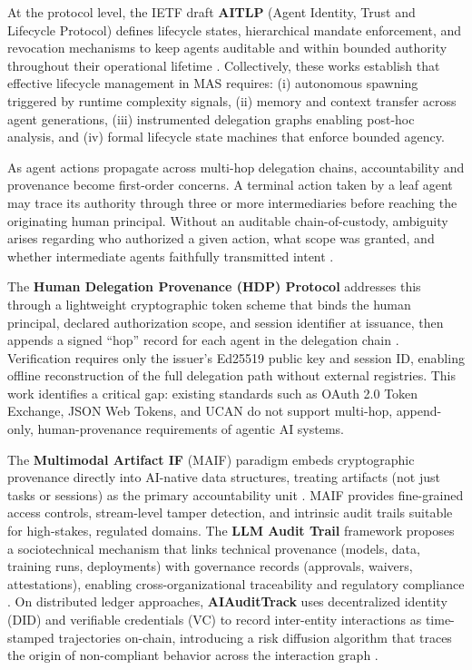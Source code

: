 At the protocol level, the IETF draft \textbf{AITLP} (Agent Identity, Trust and Lifecycle Protocol) defines lifecycle states, hierarchical mandate enforcement, and revocation mechanisms to keep agents auditable and within bounded authority throughout their operational lifetime \cite{aitlp_2026}. Collectively, these works establish that effective lifecycle management in MAS requires: (i) autonomous spawning triggered by runtime complexity signals, (ii) memory and context transfer across agent generations, (iii) instrumented delegation graphs enabling post-hoc analysis, and (iv) formal lifecycle state machines that enforce bounded agency.


As agent actions propagate across multi-hop delegation chains, accountability and provenance become first-order concerns. A terminal action taken by a leaf agent may trace its authority through three or more intermediaries before reaching the originating human principal. Without an auditable chain-of-custody, ambiguity arises regarding who authorized a given action, what scope was granted, and whether intermediate agents faithfully transmitted intent \cite{hdp_2026}.

The \textbf{Human Delegation Provenance (HDP) Protocol} addresses this through a lightweight cryptographic token scheme that binds the human principal, declared authorization scope, and session identifier at issuance, then appends a signed ``hop'' record for each agent in the delegation chain \cite{hdp_2026}. Verification requires only the issuer's Ed25519 public key and session ID, enabling offline reconstruction of the full delegation path without external registries. This work identifies a critical gap: existing standards such as OAuth 2.0 Token Exchange, JSON Web Tokens, and UCAN do not support multi-hop, append-only, human-provenance requirements of agentic AI systems.

The \textbf{Multimodal Artifact IF} (MAIF) paradigm embeds cryptographic provenance directly into AI-native data structures, treating artifacts (not just tasks or sessions) as the primary accountability unit \cite{maif_2025}. MAIF provides fine-grained access controls, stream-level tamper detection, and intrinsic audit trails suitable for high-stakes, regulated domains. The \textbf{LLM Audit Trail} framework proposes a sociotechnical mechanism that links technical provenance (models, data, training runs, deployments) with governance records (approvals, waivers, attestations), enabling cross-organizational traceability and regulatory compliance \cite{llm_audit_trail_2026}. On distributed ledger approaches, \textbf{AIAuditTrack} uses decentralized identity (DID) and verifiable credentials (VC) to record inter-entity interactions as time-stamped trajectories on-chain, introducing a risk diffusion algorithm that traces the origin of non-compliant behavior across the interaction graph \cite{aiauditrack_2024}.


